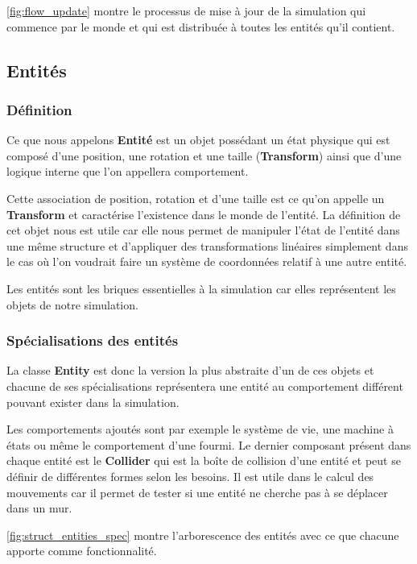 \documentclass{EPUProjetDi}
\begin{document}
\autoref{fig:flow_update} montre le processus de mise à jour de la simulation qui commence par le monde et 
qui est distribuée à toutes les entités qu'il contient.

\pagebreak
\subsection{Entités}

\subsubsection*{Définition}

Ce que nous appelons \textbf{Entité} est un objet possédant un état physique qui est composé d'une position, une rotation et une taille (\textbf{Transform}) 
ainsi que d'une logique interne que l'on appellera comportement.

Cette association de position, rotation et d'une taille est ce qu'on appelle un \textbf{Transform} et caractérise l'existence dans le monde de l'entité.
La définition de cet objet nous est utile car elle nous permet de manipuler l'état de l'entité dans une même structure et d'appliquer des transformations
linéaires simplement dans le cas où l'on voudrait faire un système de coordonnées relatif à une autre entité.

Les entités sont les briques essentielles à la simulation car elles représentent les objets de notre simulation. 

\subsubsection*{Spécialisations des entités}

La classe \textbf{Entity} est donc la version la plus abstraite d'un de ces objets et chacune de ses spécialisations
représentera une entité au comportement différent pouvant exister dans la simulation.

Les comportements ajoutés sont par exemple le système de vie, une machine à états ou même le comportement d'une fourmi.
Le dernier composant présent dans chaque entité est le \textbf{Collider} qui est la boîte de collision d'une entité et peut se définir 
de différentes formes selon les besoins. Il est utile dans le calcul des mouvements car il permet de tester si une entité ne cherche pas 
à se déplacer dans un mur.

\autoref{fig:struct_entities_spec} montre l'arborescence des entités avec ce que chacune apporte comme fonctionnalité.
\end{document}

